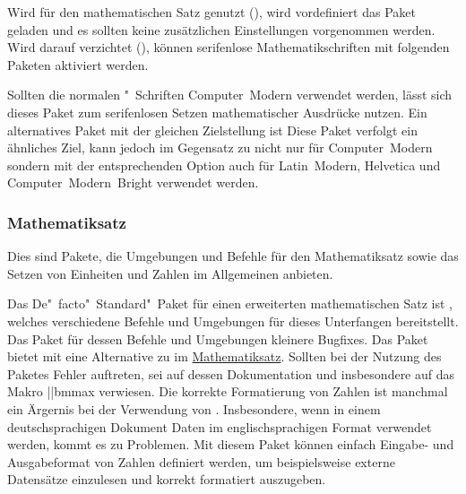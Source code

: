 %
Wird für den mathematischen Satz \OpenSans genutzt (), wird 
vordefiniert das Paket  geladen und es sollten keine 
zusätzlichen Einstellungen vorgenommen werden. Wird darauf verzichtet 
(), können serifenlose Mathematikschriften mit folgenden 
Paketen aktiviert werden.

\begin{DeclarePackages}
  Sollten die normalen "~Schriften Computer~Modern verwendet 
  werden, lässt sich dieses Paket zum serifenlosen Setzen mathematischer 
  Ausdrücke nutzen. Ein alternatives Paket mit der gleichen Zielstellung ist 
  Diese Paket verfolgt ein ähnliches Ziel, kann jedoch im Gegensatz zu 
   nicht nur für Computer~Modern sondern mit der 
  entsprechenden Option auch für Latin~Modern, Helvetica und 
  Computer~Modern~Bright verwendet werden.
\end{DeclarePackages}



\subsubsection{Mathematiksatz}
%
Dies sind Pakete, die Umgebungen und Befehle für den Mathematiksatz sowie das 
Setzen von Einheiten und Zahlen im Allgemeinen anbieten.

\begin{DeclarePackages}
  Das De"~facto"~Standard"~Paket für einen erweiterten mathematischen Satz ist 
  , welches verschiedene Befehle und Umgebungen für dieses 
  Unterfangen bereitstellt. Das Paket  für dessen Befehle 
  und Umgebungen kleinere Bugfixes.
  Das Paket bietet mit  eine Alternative zu  im 
  \href{http://tex.stackexchange.com/q/3238}{Mathematiksatz}. Sollten bei
  der Nutzung des Paketes Fehler auftreten, sei auf dessen Dokumentation und 
  insbesondere auf das Makro \Macro||{bmmax} verwiesen.
  Die korrekte Formatierung von Zahlen ist manchmal ein Ärgernis bei der  
  Verwendung von . Insbesondere, wenn in einem deutschsprachigen 
  Dokument Daten im englischsprachigen Format verwendet werden, kommt es zu 
  Problemen. Mit diesem Paket können einfach Eingabe- und Ausgabeformat von 
  Zahlen definiert werden, um beispielsweise externe Datensätze einzulesen und 
  korrekt formatiert auszugeben.
\end{DeclarePackages}


